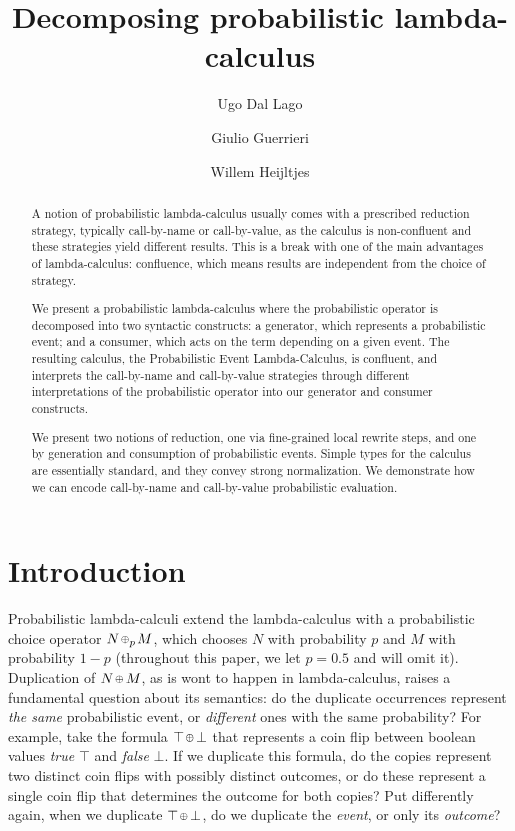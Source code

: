 \documentclass{llncs}
\title{Decomposing probabilistic lambda-calculus}
\author{
	 Ugo Dal Lago\inst1
\and Giulio Guerrieri\inst2
\and Willem Heijltjes\inst2
}
\institute{%
Dipartimento di Informatica - Scienza e Ingegneria\\ Universit\`a di Bologna, Bologna, Italy\\
\email{ugo.dallago@unibo.it}\\[10pt]
\and%
Department of Computer Science\\ University of Bath, Bath, UK\\
\email{\{w.b.heijltjes,g.guerrieri\}@bath.ac.uk}
}
\theoremstyle{definition}
\theoremstyle{plain}
\newcommand\+[1][{}]{\kern1pt{\smallbin\oplus}_{#1}\kern1pt}
\begin{document}
\maketitle

\begin{abstract}
A notion of probabilistic lambda-calculus usually comes with a prescribed reduction strategy, typically call-by-name or call-by-value, as the calculus is non-confluent and these strategies yield different results. This is a break with one of the main advantages of lambda-calculus: confluence, which means results are independent from the choice of strategy.

We present a probabilistic lambda-calculus where the probabilistic operator is decomposed into two syntactic constructs: a generator, which represents a probabilistic event; and a consumer, which acts on the term depending on a given event. The resulting calculus, the Probabilistic Event Lambda-Calculus, is confluent, and interprets the call-by-name and call-by-value strategies through different interpretations of the probabilistic operator into our generator and consumer constructs.

We present two notions of reduction, one via fine-grained local rewrite steps, and one by generation and consumption of probabilistic events. Simple types for the calculus are essentially standard, and they convey strong normalization. We demonstrate how we can encode call-by-name and call-by-value probabilistic evaluation.
\end{abstract}

\section{Introduction}

Probabilistic lambda-calculi \cite{...} extend the lambda-calculus with a probabilistic choice operator $N\+[p]M$, which chooses $N$ with probability $p$ and $M$ with probability $1-p$ (throughout this paper, we let $p=0.5$ and will omit it). Duplication of $N\+M$, as is wont to happen in lambda-calculus, raises a fundamental question about its semantics: do the duplicate occurrences represent \emph{the same} probabilistic event, or \emph{different} ones with the same probability? For example, take the formula $\top\+\bot$ that represents a coin flip between boolean values \emph{true} $\top$ and \emph{false} $\bot$. If we duplicate this formula, do the copies represent two distinct coin flips with possibly distinct outcomes, or do these represent a single coin flip that determines the outcome for both copies? Put differently again, when we duplicate $\top\+\bot$, do we duplicate the \emph{event}, or only its \emph{outcome}?
\end{document}
